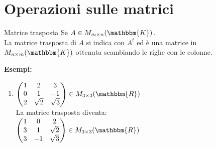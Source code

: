 \documentclass[12pt, letterpaper]{report}
\newcounter{definition}
\newcommand{\nmu}{}
\begin{document}
 		\section{Operazioni sulle matrici}
 		\begin{definition}{\nmu Matrice trasposta}
 			Se $A \in M_{m \times n}(\mathbbm{K})$. \\
 			La matrice trasposta di $A$  si indica con $A^t$ ed è una matrice in $M_{n \times m}(\mathbbm{K})$ ottenuta scambiando le righe con le colonne.

 		\end{definition}
 		\textbf{Esempi:}
 		\begin{enumerate}
 			\item $\begin{pmatrix}
 				1 & 2 & 3 \\
 				0 & 1 & -1 \\
 				2 & \sqrt{2} & \sqrt{3}
 			\end{pmatrix} \in M_{3 \times 3}(\mathbbm{R})$ \\
 			La matrice trasposta diventa: \\
 			 $\begin{pmatrix}
 			 	1 & 0 & 2 \\
 			 	3 & 1 & \sqrt{2} \\
 			 	3 & -1 & \sqrt{3}
 			 \end{pmatrix} \in M_{3 \times 3}(\mathbbm{R})$
 		\end{enumerate}
\end{document}
